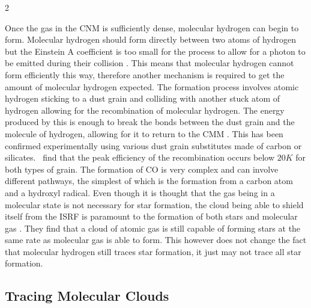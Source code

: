 \documentclass[a4paper,11pt]{article}
\begin{document}
\begin{multicols}{2}
\par\noindent Once the gas in the CNM is sufficiently dense, molecular hydrogen can begin to form. Molecular hydrogen should form directly between two atoms of hydrogen but the Einstein A coefficient is too small for the process to allow for a photon to be emitted during their collision \parencite{H2_formation}. This means that molecular hydrogen cannot form efficiently this way, therefore another mechanism is required to get the amount of molecular hydrogen expected. The formation process involves atomic hydrogen sticking to a dust grain and colliding with another stuck atom of hydrogen allowing for the recombination of molecular hydrogen. The energy produced by this is enough to break the bonds between the dust grain and the molecule of hydrogen, allowing for it to return to the CMM \parencite{H2_formation}. This has been confirmed experimentally using various dust grain substitutes made of carbon or silicates.\ \cite{dust_grain_experiment} find that the peak efficiency of the recombination occurs below $20K$ for both types of grain. The formation of CO is very complex \parencite[see][]{CO_formation} and can involve different pathways, the simplest of which is the formation from a carbon atom and a hydroxyl radical. Even though it is thought that the gas being in a molecular state is not necessary for star formation, the cloud being able to shield itself from the ISRF is paramount to the formation of both stars and molecular gas \parencite{CO_cooling}. They find that a cloud of atomic gas is still capable of forming stars at the same rate as molecular gas is able to form. This however does not change the fact that molecular hydrogen still traces star formation, it just may not trace all star formation. 

\subsection*{Tracing Molecular Clouds}


\end{multicols}
\end{document}
